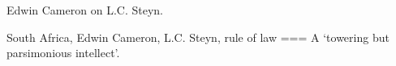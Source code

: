 Edwin Cameron on L.C. Steyn.

South Africa, Edwin Cameron, L.C. Steyn, rule of law
===
A ‘towering but parsimonious intellect’.

\nocite{cameron1982}